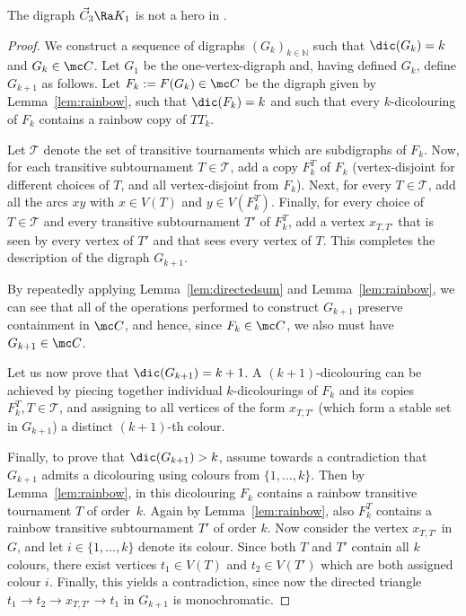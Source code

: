 


\begin{theorem}
The digraph $\vec C_3 \Ra K_1$ is not a hero in \ocgs. 
\end{theorem}
\begin{proof}
We construct a sequence of digraphs $(G_k)_{k \in \mathbb N}$ such that $\dic(G_k)=k$ and $G_k \in \mc C$.  
Let $G_1$ be the one-vertex-digraph and, having defined $G_k$, define $G_{k+1}$ as follows. Let $F_k:=F(G_k) \in \mc C$ be the digraph given by Lemma~\ref{lem:rainbow}, such that $\dic(F_k)=k$ and such that every $k$-dicolouring of $F_k$ contains a rainbow copy of $TT_k$. 

Let $\mathcal{T}$ denote the set of transitive tournaments which are subdigraphs of $F_k$. Now, for each transitive subtournament $T \in \mathcal{T}$, add a copy $F^T_k$ of $F_k$ (vertex-disjoint for different choices of $T$, and all vertex-disjoint from $F_k$). Next, for every $T \in \mathcal{T}$, add all the arcs $xy$ with $x \in V(T)$ and $y \in V(F^T_k)$. Finally, for every choice of $T \in \mathcal{T}$ and every transitive subtournament $T'$ of $F^T_k$, add a vertex $x_{T,T'}$ that is seen by every vertex of $T'$ and that sees every vertex of $T$.  
This completes the description of the digraph $G_{k+1}$.

By repeatedly applying Lemma~\ref{lem:directedsum} and Lemma~\ref{lem:rainbow}, we can see that all of the operations performed to construct $G_{k+1}$ preserve containment in $\mc C$, and hence, since $F_k \in \mc C$, we also must have $G_{k+1} \in \mc C$. 

Let us now prove that $\dic(G_{k+1}) = k+1$. A $(k+1)$-dicolouring can be achieved by piecing together individual $k$-dicolourings of $F_k$ and its copies $F_k^T, T \in \mathcal{T}$, and assigning to all vertices of the form $x_{T,T'}$ (which form a stable set in $G_{k+1}$) a distinct $(k+1)$-th colour. 

Finally, to prove that $\dic(G_{k+1})>k$, assume towards a contradiction that $G_{k+1}$ admits a dicolouring using colours from $\{1,\ldots,k\}$. Then by Lemma~\ref{lem:rainbow}, in this dicolouring $F_k$ contains a rainbow transitive tournament $T$ of order~$k$. Again by Lemma~\ref{lem:rainbow}, also $F^T_k$ contains a rainbow transitive subtournament $T'$ of order $k$. Now consider the vertex $x_{T,T'}$ in $G$, and let $i \in \{1,\ldots,k\}$ denote its colour. Since both $T$ and $T'$ contain all $k$ colours, there exist vertices $t_1 \in V(T)$ and $t_2 \in V(T')$ which are both assigned colour $i$. Finally, this yields a contradiction, since now the directed triangle $t_1 \rightarrow t_2 \rightarrow x_{T, T'} \rightarrow t_1$ in $G_{k+1}$ is monochromatic. 
\end{proof}



